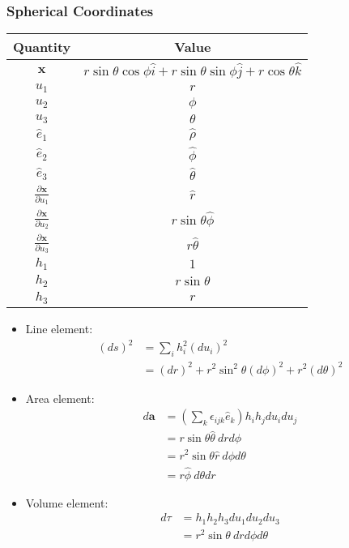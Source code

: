 \documentclass[10pt]{mypackage}
\begin{document}
\subsubsection{Spherical Coordinates}%
\begin{center}
  \renewcommand{\arraystretch}{1.5}
  \begin{tabular}{c|c}
    Quantity & Value\\
    \hline\hline
    $\mathbf{x}$ & $r\sin\theta\cos\phi \hat{i} + r\sin\theta\sin\phi \hat{j} + r\cos\theta \hat{k}$\\
    \hline
    $u_1$ & $r$\\
    $u_2$ & $\phi$\\
    $u_3$ & $\theta$\\
    \hline
    $\hat{e}_1$ & $\hat{\rho}$\\
    $\hat{e}_2$ & $\hat{\phi}$\\
    $\hat{e}_3$ & $\hat{\theta}$\\
    \hline
    $\frac{\partial \mathbf{x}}{\partial u_1}$ & $\hat{r}$\\
    $\frac{\partial \mathbf{x}}{\partial u_2}$ & $r\sin\theta\hat{\phi}$\\
    $\frac{\partial \mathbf{x}}{\partial u_3}$ & $r\hat{\theta}$\\
    \hline
    $h_1$ & $1$\\
    $h_2$ & $r\sin\theta$\\
    $h_3$ & $r$
  \end{tabular}
\end{center}
\begin{itemize}
  \item Line element:
    \begin{align*}
      \left(ds\right)^2 &= \sum_{i}h_i^2\left(du_i\right)^2\\
                        &= \left(dr\right)^2 + r^2\sin^2\theta \left(d\phi\right)^2 + r^2\left(d\theta\right)^2
    \end{align*}
  \item Area element:
    \begin{align*}
      d\mathbf{a} &= \left(\sum_{k}\epsilon_{ijk}\hat{e}_k\right)h_ih_jdu_idu_j\\
                  &= r\sin\theta \hat{\theta}\: drd\phi\\
                  &= r^2\sin\theta\hat{r}\:d\phi d\theta\\
                  &= r\hat{\phi}\: d\theta dr
    \end{align*}
  \item Volume element:
    \begin{align*}
      d\tau &= h_1h_2h_3 du_1du_2du_3\\
            &= r^2\sin\theta\: dr d\phi d\theta
    \end{align*}
\end{itemize}
\end{document}
